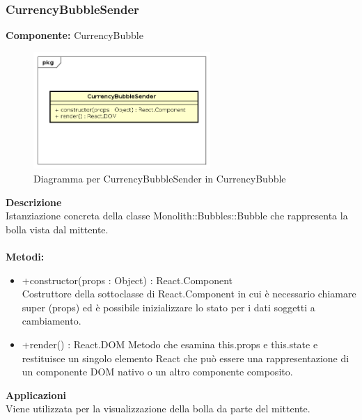 \clearpage

\subsubsection{CurrencyBubbleSender}
\textbf{Componente:}  CurrencyBubble\\
   \FloatBarrier
   \begin{figure}[ht]
   \centering
   \includegraphics[width=0.6\textwidth]{img/single-CurrencyBubbleSender}
   \caption{{Diagramma per CurrencyBubbleSender in CurrencyBubble}}
\end{figure}
\FloatBarrier
\textbf{Descrizione}\\
Istanziazione concreta della classe Monolith::Bubbles::Bubble che rappresenta la bolla vista dal mittente.
\\
\\
\textbf{Metodi:} 
\begin{itemize}
\item +constructor(props : Object) : React.Component 
\\
Costruttore della sottoclasse di React.Component in cui è necessario chiamare super (props) ed è possibile inizializzare lo stato per i dati soggetti a cambiamento.

\item +render() : React.DOM
Metodo che esamina this.props e this.state e restituisce un singolo elemento React che può essere una rappresentazione di un componente DOM nativo o un altro componente composito.

\end{itemize} 


\textbf{Applicazioni}\\
Viene utilizzata per la visualizzazione della bolla da parte del mittente. 


\clearpage

